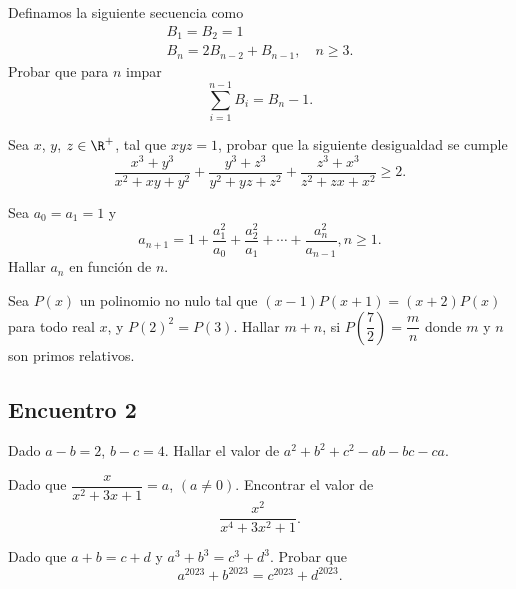 \begin{section-problem}
    Definamos la siguiente secuencia como
    \begin{gather*}
        B_1 = B_2 = 1\\
        B_n = 2 B_{n - 2} + B_{n - 1}, \quad n \geq 3.
    \end{gather*}
    Probar que para $n$ impar
    \[\sum_{i = 1}^{n - 1} B_i = B_n - 1.\]
\end{section-problem}

\begin{section-problem}
    Sea $x$, $y$, $z \in \R^+$, tal que $xyz = 1$, probar que la siguiente desigualdad se cumple
    \[\frac{x^3 + y^3}{x^2 + xy + y^2} + \frac{y^3 + z^3}{y^2 + yz + z^2} + \frac{z^3 + x^3}{z^2 + zx + x^2} \geq 2.\]
\end{section-problem}

\begin{section-problem}
    Sea $a_0 = a_1 = 1$ y
    \[a_{n + 1} = 1 + \frac{a^2_1}{a_0} + \frac{a^2_2}{a_1} + \cdots + \frac{a^2_n}{a_{n - 1}}, n \geq 1.\]
    Hallar $a_n$ en función de $n$.
\end{section-problem}

\begin{section-problem}
    Sea $P(x)$ un polinomio no nulo tal que $(x - 1)P(x + 1) = (x + 2)P(x)$ para todo real $x$, y $P(2)^2 = P(3)$.
    Hallar $m + n$, si $P\left(\dfrac{7}{2}\right) = \dfrac{m}{n}$ donde $m$ y $n$ son primos relativos.
\end{section-problem}





\subsection{Encuentro 2}

\begin{section-problem}
    Dado $a - b = 2$, $b - c = 4$.
    Hallar el valor de $a^2 + b^2 + c^2 - ab - bc - ca$.
\end{section-problem}

\begin{section-problem}
    Dado que $\dfrac{x}{x^2 + 3x + 1} = a$, $(a \neq 0)$.
    Encontrar el valor de
    \[\frac{x^2}{x^4 + 3x^2 + 1}.\]
\end{section-problem}

\begin{section-problem}
    Dado que $a + b = c + d$ y $a^3 + b^3 = c^3 + d^3$.
    Probar que
    \[a^{2023} + b^{2023} = c^{2023} + d^{2023}.\]
\end{section-problem}

